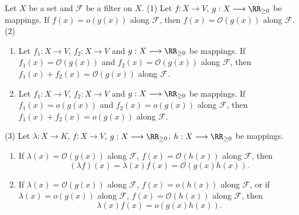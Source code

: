 \begin{propositionenv}
    Let $X$ be a set and $\mathcal{F}$ be a filter on $X$.
    \newline
    (1) Let $f:X\longrightarrow V$, $g:X\longrightarrow \RR_{\ge 0}$ be mappings. If $f(x)=o(g(x))$ along $\mathcal{F}$, then $f(x)=\mathcal{O}(g(x))$ along $\mathcal{F}$.
    \newline
    (2) \begin{enumerate}
        \item Let $f_1:X\longrightarrow V$, $f_2:X\longrightarrow V$ and $g:X\longrightarrow \RR_{\ge 0}$ be mappings. If $f_1(x)=\mathcal{O}(g(x))$ and $f_2(x)=\mathcal{O}(g(x))$ along $\mathcal{F}$, then $f_1(x)+f_2(x)=\mathcal{O}(g(x))$ along $\mathcal{F}$.
        \item Let $f_1:X\longrightarrow V$, $f_2:X\longrightarrow V$ and $g:X\longrightarrow \RR_{\ge 0}$ be mappings. If $f_1(x)=o(g(x))$ and $f_2(x)=o(g(x))$ along $\mathcal{F}$, then $f_1(x)+f_2(x)=o(g(x))$ along $\mathcal{F}$.
    \end{enumerate}
    (3) Let $\lambda:X\longrightarrow K$, $f:X\longrightarrow V$, $g:X\longrightarrow \RR_{\ge 0}$, $h:X\longrightarrow \RR_{\ge 0}$ be mappings. 
    \begin{enumerate}
        \item If $\lambda(x)=\mathcal{O}\left(g(x)\right)$ along $\mathcal{F}$, $f(x)=\mathcal{O}\left(h(x)\right)$ along $\mathcal{F}$, then
            $$(\lambda f)(x)=\lambda(x)f (x)=\mathcal{O}\left(g(x)h(x)\right).$$
        \item If $\lambda(x)=\mathcal{O}\left(g(x)\right)$ along $\mathcal{F}$, $f(x)=o\left(h(x)\right)$ along $\mathcal{F}$, or if $\lambda(x)=o\left(g(x)\right)$ along $\mathcal{F}$, $f(x)=\mathcal{O}\left(h(x)\right)$ along $\mathcal{F}$, then
            $$\lambda(x)f(x)=o\left(g(x)h(x)\right).$$
    \end{enumerate}
\end{propositionenv}
